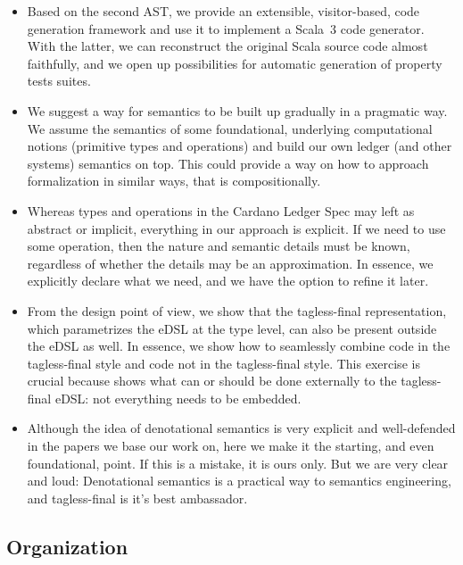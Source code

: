 \documentclass[11pt]{article}
\begin{document}
\begin{itemize}
	\item Based on the second AST, we provide an extensible, visitor-based, code generation framework and use it to implement a Scala~3 code generator. With the latter, we can reconstruct the original Scala source code almost faithfully, and we open up possibilities for automatic generation of property tests suites.
		
	\item We suggest a way for semantics to be built up gradually in a pragmatic way. We assume the semantics of some foundational, underlying computational notions (primitive types and operations) and build our own ledger (and other systems) semantics on top. This could provide a way on how to approach formalization in similar ways, that is compositionally.
	
	\item Whereas types and operations in the Cardano Ledger Spec may left as abstract or implicit, everything in our approach is explicit. If we need to use some operation, then the nature and semantic details must be known, regardless of whether the details may be an approximation. In essence, we explicitly declare what we need, and we have the option to refine it later.
	
	  \item From the design point of view, we show that the tagless-final representation, which parametrizes the eDSL at the type level, can also be present outside the eDSL as well. In essence, we show how to seamlessly combine code in the tagless-final style and code not in the tagless-final style. This exercise is crucial because shows what can or should be done externally to the tagless-final eDSL: not everything needs to be embedded.
	  
	  \item Although the idea of denotational semantics is very explicit and well-defended in the papers we base our work on, here we make it the starting, and even foundational, point. If this is a mistake, it is ours only. But we are very clear and loud: Denotational semantics is a practical way to semantics engineering, and tagless-final is it's best ambassador.
\end{itemize}

\subsection{Organization}
\end{document}
